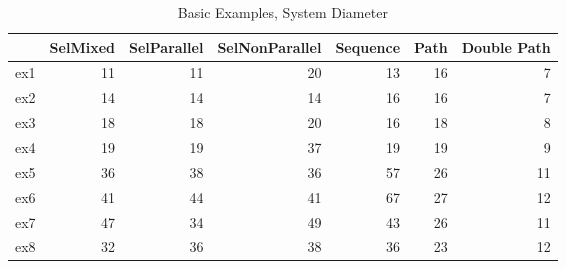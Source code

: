 \begin{table}
\centering
\caption{Basic Examples, System Diameter}
\label{b_e_diam}
\begin{tabular}{lrrrrrr}
\toprule
{} &  SelMixed &  SelParallel &  SelNonParallel &  Sequence &  Path &  Double Path \\
\midrule
ex1 &        11 &           11 &              20 &        13 &    16 &            7 \\
ex2 &        14 &           14 &              14 &        16 &    16 &            7 \\
ex3 &        18 &           18 &              20 &        16 &    18 &            8 \\
ex4 &        19 &           19 &              37 &        19 &    19 &            9 \\
ex5 &        36 &           38 &              36 &        57 &    26 &           11 \\
ex6 &        41 &           44 &              41 &        67 &    27 &           12 \\
ex7 &        47 &           34 &              49 &        43 &    26 &           11 \\
ex8 &        32 &           36 &              38 &        36 &    23 &           12 \\
\bottomrule
\end{tabular}
\end{table}
